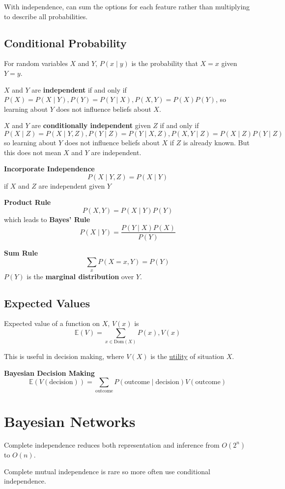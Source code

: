 \documentclass[11pt]{article}
\begin{document}
With independence, can sum the options for each feature rather than multiplying to describe
all probabilities.
\subsection{Conditional Probability}
\label{sec:org152750e}
For random variables \(X\) and \(Y\),
\(P(x \mid y)\) is the probability that \(X = x\) given \(Y = y\).

\(X\) and \(Y\) are \textbf{independent} if and only if \(P(X) = P(X \mid Y), P(Y) = P(Y \mid X), P(X,Y) = P(X)P(Y)\),
so learning about \(Y\) does not influence beliefs about \(X\).

\(X\) and \(Y\) are \textbf{conditionally independent} given \(Z\) if and only if
\(P(X \mid Z) = P(X \mid Y, Z), P(Y \mid Z) = P(Y \mid X, Z), P(X, Y \mid Z) = P(X \mid Z) P(Y \mid Z)\)
so learning about \(Y\) does not influence beliefs about \(X\) if \(Z\) is already known.
But this does not mean \(X\) and \(Y\) are independent.

\textbf{Incorporate Independence}
$$ P(X \mid Y, Z) = P(X \mid Y) $$
if \(X\) and \(Z\) are independent given \(Y\)

\textbf{Product Rule}
$$ P(X,Y) = P(X \mid Y) P (Y) $$
which leads to \textbf{Bayes' Rule}
$$ P(X \mid Y) = \frac{P(Y \mid X) P(X)}{P(Y)} $$

\textbf{Sum Rule}
$$ \sum_{x} P(X = x, Y) = P(Y) $$
\(P(Y)\) is the \textbf{marginal distribution} over \(Y\).
\subsection{Expected Values}
\label{sec:orge4358dc}
Expected value of a function on \(X\), \(V(x)\) is
$$ \mathds{E}(V) = \sum_{x \in \text{Dom}(X)} P(x), V(x) $$

This is useful in decision making, where \(V(X)\) is the \uline{utility} of situation \(X\).

\textbf{Bayesian Decision Making}
$$ \mathds{E}(V(\text{decision})) = \sum_{\text{outcome}} P(\text{outcome} \mid \text{decision}) V(\text{outcome}) $$
\section{Bayesian Networks}
\label{sec:orgc6588e2}
Complete independence reduces both representation and inference from \(O(2^{n})\) to \(O(n)\).

Complete mutual independence is rare so more often use conditional independence.
\end{document}
